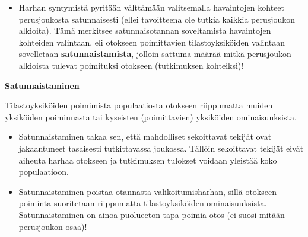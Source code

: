 \documentclass[
]{book}
\providecommand{\tightlist}{%
  \setlength{\itemsep}{0pt}\setlength{\parskip}{0pt}}
\begin{document}
\begin{itemize}
\tightlist
\item
  Harhan syntymistä pyritään välttämään valitsemalla havaintojen kohteet perusjoukosta satunnaisesti (ellei tavoitteena ole tutkia kaikkia perusjoukon alkioita). Tämä merkitsee satunnaisotannan soveltamista havaintojen kohteiden valintaan, eli otokseen poimittavien tilastoyksiköiden valintaan sovelletaan \textbf{satunnaistamista}, jolloin sattuma määrää mitkä perusjoukon alkioista tulevat poimituksi otokseen (tutkimuksen kohteiksi)!
\end{itemize}

\begin{defblock}{}

\textbf{Satunnaistaminen}

Tilastoyksiköiden poimimista populaatiosta otokseen riippumatta muiden yksiköiden poiminnasta tai kyseisten (poimittavien) yksiköiden ominaisuuksista.

\begin{itemize}
\item
  Satunnaistaminen takaa sen, että mahdolliset sekoittavat tekijät ovat jakaantuneet tasaisesti tutkittavassa joukossa. Tällöin sekoittavat tekijät eivät aiheuta harhaa otokseen ja tutkimuksen tulokset voidaan yleistää koko populaatioon.
\item
  Satunnaistaminen poistaa otannasta valikoitumisharhan, sillä otokseen poiminta suoritetaan riippumatta tilastoyksiköiden ominaisuuksista. Satunnaistaminen on ainoa puolueeton tapa poimia otos (ei suosi mitään perusjoukon osaa)!
\end{itemize}

\end{defblock}
\end{document}
